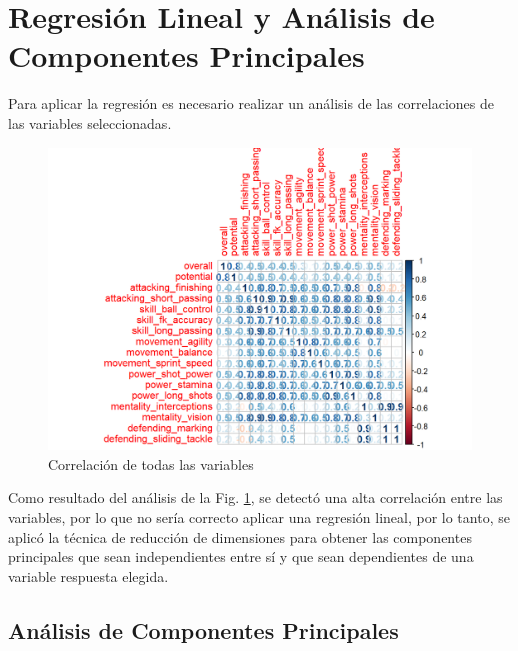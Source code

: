 \documentclass[a4paper,10pt,twocolumn]{article}
\begin{document}


\section{Regresión Lineal y Análisis de Componentes Principales}\label{sec:reg_acp}

Para aplicar la regresión es necesario realizar un análisis de las correlaciones de las variables seleccionadas.

\begin{figure}[htb]%
	\begin{center}
		\includegraphics[width=\linewidth]{cor_general}
	\end{center}
	\caption{Correlación de todas las variables \label{fig:cor_general}}%
\end{figure}

Como resultado del análisis de la Fig. \ref{fig:cor_general}, se detectó una alta correlación entre las variables, por lo que no sería correcto aplicar una regresión lineal, por lo tanto, se aplicó la técnica de reducción de dimensiones para obtener las componentes principales que sean independientes entre sí y que sean dependientes de una variable respuesta elegida.

\subsection{Análisis de Componentes Principales}\label{sec:acp}
\end{document}
